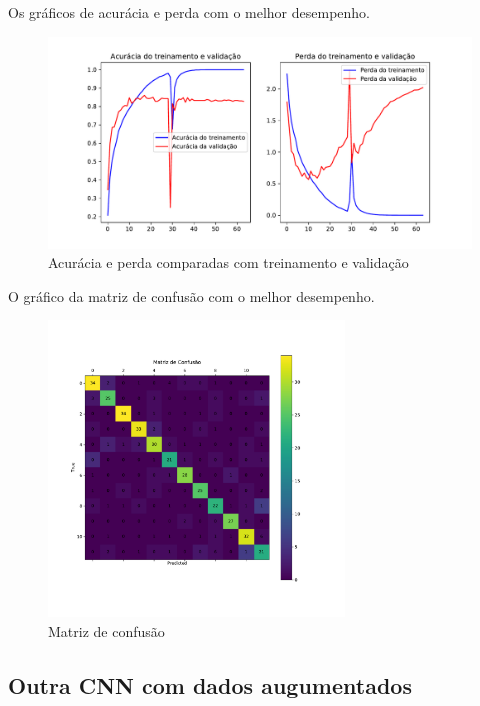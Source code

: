 \documentclass[12pt,
	english,			%
	french,				%
	spanish,			%
	brazil,				%
	]{article}
\begin{document}
Os gráficos de acurácia e perda com o melhor desempenho.

\begin{figure}[!htb]
\centering
\includegraphics[width=1\textwidth]{images/history_lenet5_augmented.pdf}
\caption{\label{fig:grafico01}Acurácia e perda comparadas com treinamento e validação}
\end{figure}

O gráfico da matriz de confusão com o melhor desempenho.

\clearpage

\begin{figure}[!htb]
\centering
\includegraphics[width=0.7\textwidth]{images/cm_lenet5_augmented.pdf}
\caption{\label{fig:grafico01}Matriz de confusão}
\end{figure}


\subsection{Outra CNN com dados augumentados}
\end{document}

